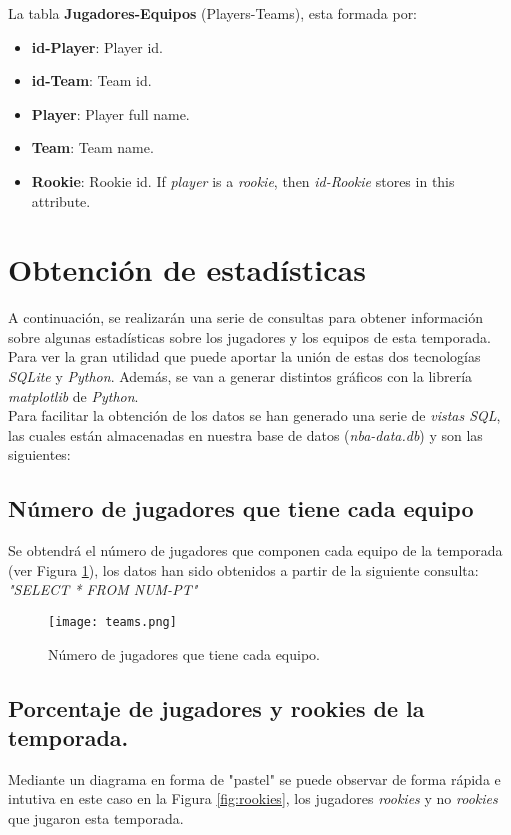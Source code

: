 \documentclass[11pt]{diazessay} %
\begin{document}
La tabla \textbf{Jugadores-Equipos} (Players-Teams), esta formada por:
\begin{itemize}
	\item\textbf{id-Player}: Player id.
	\item\textbf{id-Team}: Team id.
	\item\textbf{Player}: Player full name.
	\item\textbf{Team}: Team name.
	\item\textbf{Rookie}: Rookie id. If \textit{player} is a \textit{rookie}, then \textit{id-Rookie} stores in this attribute.
\end{itemize}

\clearpage

\section*{Obtención de estadísticas}
A continuación, se realizarán una serie de consultas para obtener información sobre algunas estadísticas sobre los jugadores y los equipos de esta temporada. Para ver la gran utilidad que puede aportar la unión de estas dos tecnologías \textit{SQLite} \cite{sqlite} y \textit{Python}. Además, se van a generar distintos gráficos con la librería \textit{matplotlib} \cite{matplotlib} de \textit{Python}. \\

Para facilitar la obtención de los datos se han generado una serie de \textit{vistas SQL}, las cuales están almacenadas en nuestra base de datos (\textit{nba-data.db}) y son las siguientes:
\newpage
\subsection*{Número de jugadores que tiene cada equipo}
Se obtendrá el número de jugadores que componen cada equipo de la temporada (ver Figura \ref{fig:playersteams}), los datos han sido obtenidos a partir de la siguiente consulta:\\

\textit{"SELECT * FROM NUM-PT"}

\begin{figure}[!h]
	\centering
	\texttt{[image: teams.png]}
	\caption{Número de jugadores que tiene cada equipo.}
	\label{fig:playersteams}
\end{figure}



\subsection*{Porcentaje de jugadores y rookies de la temporada.}
Mediante un diagrama en forma de "pastel" se puede observar de forma rápida e intutiva en este caso en la Figura \ref{fig:rookies}, los jugadores \textit{rookies} y no \textit{rookies} que jugaron esta temporada.\\
\end{document}
